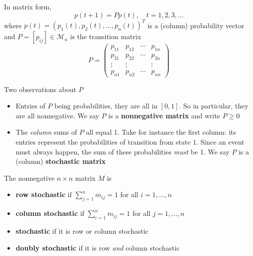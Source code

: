 \documentclass{beamer}
\def\M{\mathcal{M}}
\def\defword#1{\textbf{#1}}
\begin{document}
\begin{frame} 
In matrix form,
\begin{equation}\label{eq:CTMC_vector}
p(t+1)=Pp(t), \quad t=1,2,3,\dots
\end{equation}
where $p(t)=(p_1(t),p_{2}(t),\dots , p_n(t))^T$ is a (column) probability vector and $P=[p_{ij}]\in\M_n$ is the transition matrix
\begin{equation}\label{eq:DMTC_transition_matrix}
P=
\begin{pmatrix}
p_{11} & p_{12} & \cdots & p_{1n} \\
p_{21} & p_{22} & \cdots & p_{2n} \\
\vdots & \vdots && \vdots \\
p_{n1} & p_{n2} & \cdots & p_{nn}
\end{pmatrix}
\end{equation}
\end{frame}


\begin{frame}{Two observations about $P$}
\begin{itemize}
	\item Entries of $P$ being probabilities, they are all in $[0,1]$. So in particular, they are all nonnegative. We say $P$ is a \defword{nonnegative matrix} and write $P\geq 0$
	\vfill
	\item The \emph{column} sums of $P$ all equal 1. Take for instance the first column: its entries represent the probabilities of transition from state $1$. Since an event must always happen, the sum of these probabilities \emph{must} be 1. We say $P$ is a (column) \defword{stochastic matrix}
\end{itemize}
\end{frame}

\begin{frame} 
\begin{definition}
	The nonnegative $n\times n$ matrix $M$ is
	\begin{itemize}
		\item \defword{row stochastic} if $\sum_{j=1}^nm_{ij}=1$ for all $i=1,\dots, n$
		\item \defword{column stochastic} if $\sum_{i=1}^nm_{ij}=1$ for all $j=1,\dots, n$
		\item \defword{stochastic} if it is row or column stochastic
		\item \defword{doubly stochastic} if it is row \emph{and} column stochastic
	\end{itemize}
\end{definition}
\end{frame}
\end{document}
